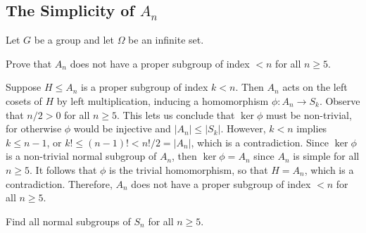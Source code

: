 \newpage

\subsection{\texorpdfstring{The Simplicity of $A_n$}{The Simplicity of An}}

Let $G$ be a group and let $\Omega$ be an infinite set.

\begin{exercise}\label{ex4.6.1}
	Prove that $A_n$ does not have a proper subgroup of index $< n$ for all $n \geq 5$.
\end{exercise}

\begin{sol}
	Suppose $H \leq A_n$ is a proper subgroup of index $k < n$. Then $A_n$ acts on the left cosets of $H$ by left multiplication, inducing a homomorphism $\phi : A_n \to S_k$. Observe that $n/2 > 0$ for all $n \geq 5$. This lets us conclude that $\ker\phi$ must be non-trivial, for otherwise $\phi$ would be injective and $|A_n| \leq |S_k|$. However, $k < n$ implies $k \leq n - 1$, or $k! \leq (n - 1)! < n!/2 = |A_n|$, which is a contradiction. Since $\ker\phi$ is a non-trivial normal subgroup of $A_n$, then $\ker\phi = A_n$ since $A_n$ is simple for all $n \geq 5$. It follows that $\phi$ is the trivial homomorphism, so that $H = A_n$, which is a contradiction. Therefore, $A_n$ does not have a proper subgroup of index $< n$ for all $n \geq 5$.
\end{sol}

\begin{exercise}\label{ex4.6.2}
	Find all normal subgroups of $S_n$ for all $n \geq 5$.
\end{exercise}

